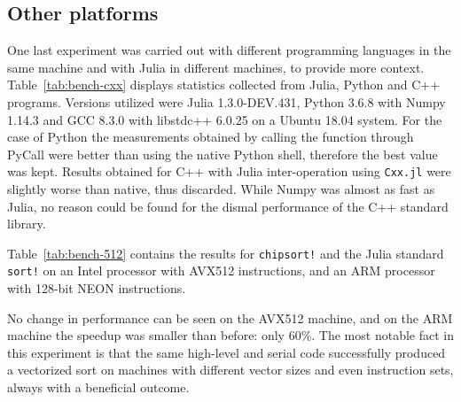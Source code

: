 \documentclass{juliacon}
\begin{document}
\subsection{Other platforms}
One last experiment was carried out with different programming languages in the same machine and with Julia in different machines, to provide more context. Table~\ref{tab:bench-cxx} displays statistics collected from Julia, Python and C++ programs. Versions utilized were Julia 1.3.0-DEV.431, Python 3.6.8 with Numpy 1.14.3 and GCC 8.3.0 with libstdc++ 6.0.25 on a Ubuntu 18.04 system. For the case of Python the measurements obtained by calling the function through PyCall were better than using the native Python shell, therefore the best value was kept. Results obtained for C++ with Julia inter-operation using {\tt Cxx.jl} were slightly worse than native, thus discarded. While Numpy was almost as fast as Julia, no reason could be found for the dismal performance of the C++ standard library.

\begin{table}[h]
\label{tab:bench-cxx}
\end{table}

Table~\ref{tab:bench-512} contains the results for {\tt chipsort!} and the Julia standard {\tt sort!} on an Intel processor with AVX512 instructions, and an ARM processor with 128-bit NEON instructions.
\begin{table}[h]
\label{tab:bench-512}
\end{table}
No change in performance can be seen on the AVX512 machine, and on the ARM machine the speedup was smaller than before: only 60\%. The most notable fact in this experiment is that the same high-level and serial code successfully produced a vectorized sort on machines with different vector sizes and even instruction sets, always with a beneficial outcome.
\end{document}
